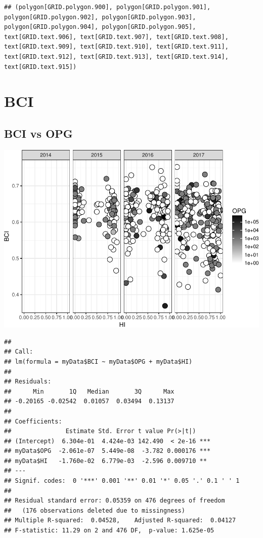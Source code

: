 \documentclass[]{article}
\begin{document}
\begin{verbatim}
## (polygon[GRID.polygon.900], polygon[GRID.polygon.901], polygon[GRID.polygon.902], polygon[GRID.polygon.903], polygon[GRID.polygon.904], polygon[GRID.polygon.905], text[GRID.text.906], text[GRID.text.907], text[GRID.text.908], text[GRID.text.909], text[GRID.text.910], text[GRID.text.911], text[GRID.text.912], text[GRID.text.913], text[GRID.text.914], text[GRID.text.915])
\end{verbatim}

\section{BCI}\label{bci}

\subsection{BCI vs OPG}\label{bci-vs-opg}

\includegraphics{Data_Analysis_Alice_files/figure-latex/BCI-1.pdf}

\begin{verbatim}
## 
## Call:
## lm(formula = myData$BCI ~ myData$OPG + myData$HI)
## 
## Residuals:
##      Min       1Q   Median       3Q      Max 
## -0.20165 -0.02542  0.01057  0.03494  0.13137 
## 
## Coefficients:
##               Estimate Std. Error t value Pr(>|t|)    
## (Intercept)  6.304e-01  4.424e-03 142.490  < 2e-16 ***
## myData$OPG  -2.061e-07  5.449e-08  -3.782 0.000176 ***
## myData$HI   -1.760e-02  6.779e-03  -2.596 0.009710 ** 
## ---
## Signif. codes:  0 '***' 0.001 '**' 0.01 '*' 0.05 '.' 0.1 ' ' 1
## 
## Residual standard error: 0.05359 on 476 degrees of freedom
##   (176 observations deleted due to missingness)
## Multiple R-squared:  0.04528,    Adjusted R-squared:  0.04127 
## F-statistic: 11.29 on 2 and 476 DF,  p-value: 1.625e-05
\end{verbatim}
\end{document}
